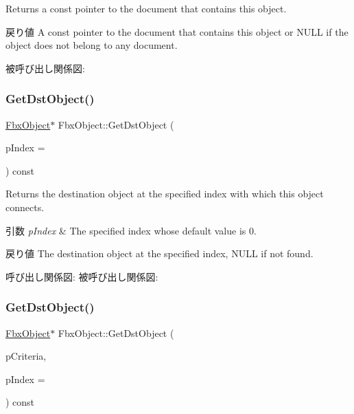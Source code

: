 Returns a const pointer to the document that contains this object. \begin{DoxyReturn}{戻り値}
A const pointer to the document that contains this object or {\ttfamily N\+U\+LL} if the object does not belong to any document. 
\end{DoxyReturn}
被呼び出し関係図\+:
\mbox{\label{class_fbx_object_a3dcc740f7d5d22a73bb726c469b41c31}} 
\subsubsection{\texorpdfstring{Get\+Dst\+Object()}{GetDstObject()}\hspace{0.1cm}{\footnotesize\ttfamily [1/4]}}
{\footnotesize\ttfamily \hyperlink{class_fbx_object}{Fbx\+Object}$\ast$ Fbx\+Object\+::\+Get\+Dst\+Object (\begin{DoxyParamCaption}\item[{int}]{p\+Index = {} }\end{DoxyParamCaption}) const}

Returns the destination object at the specified index with which this object connects. 
\begin{DoxyParams}{引数}
{\em p\+Index} & The specified index whose default value is 0. \\
\hline
\end{DoxyParams}
\begin{DoxyReturn}{戻り値}
The destination object at the specified index, N\+U\+LL if not found. 
\end{DoxyReturn}
呼び出し関係図\+:
被呼び出し関係図\+:
\mbox{\label{class_fbx_object_a353ab38d6dad42f974f9d1ab3372b4ce}} 
\subsubsection{\texorpdfstring{Get\+Dst\+Object()}{GetDstObject()}\hspace{0.1cm}{\footnotesize\ttfamily [2/4]}}
{\footnotesize\ttfamily \hyperlink{class_fbx_object}{Fbx\+Object}$\ast$ Fbx\+Object\+::\+Get\+Dst\+Object (\begin{DoxyParamCaption}\item[{const \hyperlink{class_fbx_criteria}{Fbx\+Criteria} \&}]{p\+Criteria,  }\item[{int}]{p\+Index = {} }\end{DoxyParamCaption}) const}

